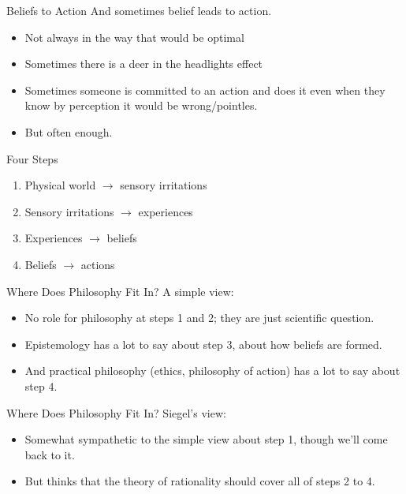 \documentclass[
  17pt,
  letterpaper,
  ignorenonframetext,
  aspectratio=169,
  handout,
  xcolor={dvipsnames}]{beamer}
\providecommand{\tightlist}{%
  \setlength{\itemsep}{0pt}\setlength{\parskip}{0pt}}\usepackage{longtable,booktabs,array}
\begin{document}
\begin{frame}{Beliefs to Action}
\protect\hypertarget{beliefs-to-action}{}
And sometimes belief leads to action.

\begin{itemize}[<+->]
\tightlist
\item
  Not always in the way that would be optimal
\item
  Sometimes there is a deer in the headlights effect
\item
  Sometimes someone is committed to an action and does it even when they
  know by perception it would be wrong/pointles.
\item
  But often enough.
\end{itemize}
\end{frame}

\begin{frame}{Four Steps}
\protect\hypertarget{four-steps-1}{}
\begin{enumerate}[<+->]
\tightlist
\item
  Physical world \(\rightarrow\) sensory irritations
\item
  Sensory irritations \(\rightarrow\) experiences
\item
  Experiences \(\rightarrow\) beliefs
\item
  Beliefs \(\rightarrow\) actions
\end{enumerate}
\end{frame}

\begin{frame}{Where Does Philosophy Fit In?}
\protect\hypertarget{where-does-philosophy-fit-in}{}
A simple view:

\begin{itemize}[<+->]
\tightlist
\item
  No role for philosophy at steps 1 and 2; they are just scientific
  question.
\item
  Epistemology has a lot to say about step 3, about how beliefs are
  formed.
\item
  And practical philosophy (ethics, philosophy of action) has a lot to
  say about step 4.
\end{itemize}
\end{frame}

\begin{frame}{Where Does Philosophy Fit In?}
\protect\hypertarget{where-does-philosophy-fit-in-1}{}
Siegel's view:

\begin{itemize}[<+->]
\tightlist
\item
  Somewhat sympathetic to the simple view about step 1, though we'll
  come back to it.
\item
  But thinks that the theory of rationality should cover all of steps 2
  to 4.
\end{itemize}
\end{frame}
\end{document}
